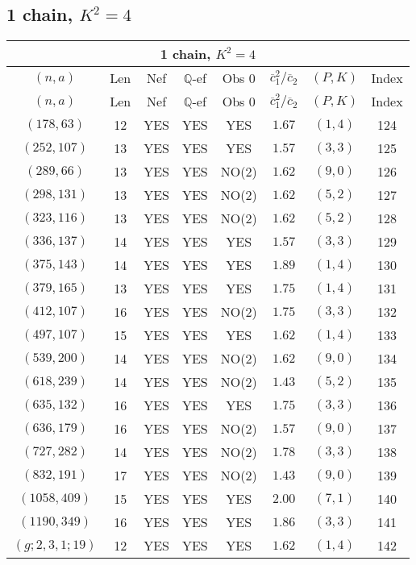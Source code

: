 \subsection{1 chain, $K^2 = 4$}
\begin{longtable}{|c|c|c|c|c|c|c|c|}
\hline
\multicolumn{8}{|c|}{1 chain, $K^2 = 4$}\\
\hline
$(n,a)$ & Len & Nef & $\mathbb Q$-ef & Obs 0 & $\overline c_1^2 / \overline c_2$ & $(P,K)$ & Index\\
\hline
\endfirsthead

\hline
$(n,a)$ & Len & Nef & $\mathbb Q$-ef & Obs 0 & $\overline c_1^2 / \overline c_2$ & $(P,K)$ & Index\\
\hline
\endhead
\hline
\endfoot

$(178,63)$ & 12 & YES & YES & YES & $1.67$ & $(1,4)$ & 124\\
$(252,107)$ & 13 & YES & YES & YES & $1.57$ & $(3,3)$ & 125\\
$(289,66)$ & 13 & YES & YES & NO(2) & $1.62$ & $(9,0)$ & 126\\
$(298,131)$ & 13 & YES & YES & NO(2) & $1.62$ & $(5,2)$ & 127\\
$(323,116)$ & 13 & YES & YES & NO(2) & $1.62$ & $(5,2)$ & 128\\
$(336,137)$ & 14 & YES & YES & YES & $1.57$ & $(3,3)$ & 129\\
$(375,143)$ & 14 & YES & YES & YES & $1.89$ & $(1,4)$ & 130\\
$(379,165)$ & 13 & YES & YES & YES & $1.75$ & $(1,4)$ & 131\\
$(412,107)$ & 16 & YES & YES & NO(2) & $1.75$ & $(3,3)$ & 132\\
$(497,107)$ & 15 & YES & YES & YES & $1.62$ & $(1,4)$ & 133\\
$(539,200)$ & 14 & YES & YES & NO(2) & $1.62$ & $(9,0)$ & 134\\
$(618,239)$ & 14 & YES & YES & NO(2) & $1.43$ & $(5,2)$ & 135\\
$(635,132)$ & 16 & YES & YES & YES & $1.75$ & $(3,3)$ & 136\\
$(636,179)$ & 16 & YES & YES & NO(2) & $1.57$ & $(9,0)$ & 137\\
$(727,282)$ & 14 & YES & YES & NO(2) & $1.78$ & $(3,3)$ & 138\\
$(832,191)$ & 17 & YES & YES & NO(2) & $1.43$ & $(9,0)$ & 139\\
$(1058,409)$ & 15 & YES & YES & YES & $2.00$ & $(7,1)$ & 140\\
$(1190,349)$ & 16 & YES & YES & YES & $1.86$ & $(3,3)$ & 141\\
$(g;2,3,1;19)$ & 12 & YES & YES & YES & $1.62$ & $(1,4)$ & 142
\end{longtable}
